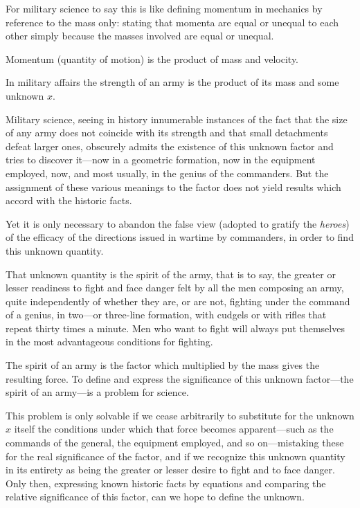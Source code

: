 For military science to say this is like defining momentum in
mechanics by reference to the mass only: stating that momenta are
equal or unequal to each other simply because the masses involved
are equal or unequal.

Momentum (quantity of motion) is the product of mass and
velocity.

In military affairs the strength of an army is the product of its
mass and some unknown $x$.

Military science, seeing in history innumerable instances of the
fact that the size of any army does not coincide with its
strength and that small detachments defeat larger ones, obscurely
admits the existence of this unknown factor and tries to discover
it---now in a geometric formation, now in the equipment employed,
now, and most usually, in the genius of the commanders. But the
assignment of these various meanings to the factor does not yield
results which accord with the historic facts.

Yet it is only necessary to abandon the false view (adopted to
gratify the \emph{heroes}) of the efficacy of the directions
issued in wartime by commanders, in order to find this unknown
quantity.

That unknown quantity is the spirit of the army, that is to say,
the greater or lesser readiness to fight and face danger felt by
all the men composing an army, quite independently of whether
they are, or are not, fighting under the command of a genius, in
two---or three-line formation, with cudgels or with rifles that
repeat thirty times a minute. Men who want to fight will always
put themselves in the most advantageous conditions for fighting.

The spirit of an army is the factor which multiplied by the mass
gives the resulting force. To define and express the significance
of this unknown factor---the spirit of an army---is a problem for
science.

This problem is only solvable if we cease arbitrarily to
substitute for the unknown $x$ itself the conditions under which
that force becomes apparent---such as the commands of the
general, the equipment employed, and so on---mistaking these for
the real significance of the factor, and if we recognize this
unknown quantity in its entirety as being the greater or lesser
desire to fight and to face danger. Only then, expressing known
historic facts by equations and comparing the relative
significance of this factor, can we hope to define the unknown.

